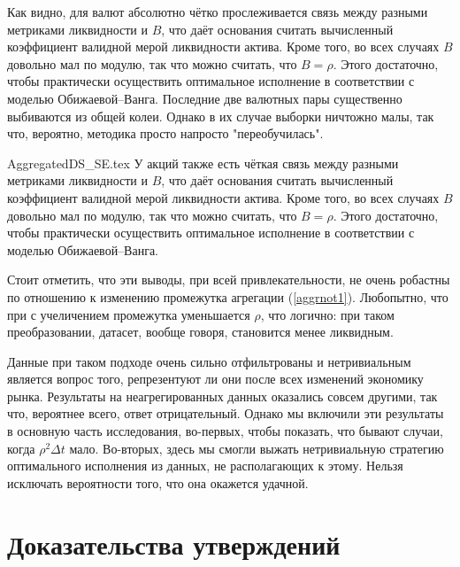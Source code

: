 Как видно, для валют абсолютно чётко прослеживается связь между разными метриками ликвидности и $B$,
что даёт основания считать вычисленный коэффициент валидной мерой ликвидности актива. Кроме того, 
во всех случаях $B$ довольно мал по модулю, так что можно считать, что $B = \rho$. Этого достаточно,
чтобы практически осуществить оптимальное исполнение в соответствии с моделью Обижаевой--Ванга.
Последние две валютных пары существенно выбиваются из общей колеи. Однако в их случае выборки ничтожно малы,
так что, вероятно, методика просто напросто "переобучилась".
\par
{AggregatedDS_SE.tex}
У акций также есть чёткая связь между разными метриками ликвидности и $B$,
что даёт основания считать вычисленный коэффициент валидной мерой ликвидности актива. Кроме того, 
во всех случаях $B$ довольно мал по модулю, так что можно считать, что $B = \rho$. Этого достаточно,
чтобы практически осуществить оптимальное исполнение в соответствии с моделью Обижаевой--Ванга.
\par
Стоит отметить, что эти выводы, при всей привлекательности, не очень робастны по отношению к изменению промежутка 
агрегации (\ref{aggrnot1}). Любопытно, что при с учеличением промежутка уменьшается $\rho$, что логично:
при таком преобразовании, датасет, вообще говоря, становится менее ликвидным.
\par
Данные при таком подходе очень сильно отфильтрованы и нетривиальным является вопрос того,
репрезентуют ли они после всех изменений экономику рынка. Результаты на неагрегированных 
данных оказались совсем другими, так что, вероятнее всего, ответ отрицательный. Однако мы
включили эти результаты в основную часть исследования, во-первых, чтобы показать, что 
бывают случаи, когда $\rho^2 \Delta t$ мало. Во-вторых, здесь мы смогли выжать нетривиальную стратегию
оптимального исполнения из данных, не располагающих к этому. Нельзя исключать вероятности того,
что она окажется удачной.

\section{Доказательства утверждений} \label{proofs}

